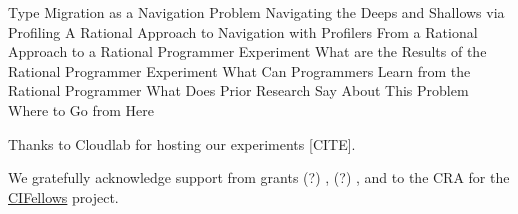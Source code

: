 \documentclass[acmsmall,review,anonymous]{acmart}
\begin{document}
       {Type Migration as a Navigation Problem}
    {Navigating the Deeps and Shallows via Profiling}
       {A Rational Approach to Navigation with Profilers}
  {From a Rational Approach to a Rational Programmer Experiment}
     {What are the Results of the Rational Programmer Experiment}
  {What Can Programmers Learn from the Rational Programmer}
     {What Does Prior Research Say About This Problem}
  {Where to Go from Here}


\begin{acks}
  Thanks to Cloudlab for hosting our experiments [CITE].

We gratefully acknowledge support from
 grants
  (?) \href{"https://www.nsf.gov/awardsearch/showAward?AWD_ID=1763922"}{},
  (?) \href{"https://www.nsf.gov/awardsearch/showAward?AWD_ID=1823244"}{},
 and
 \href{"https://www.nsf.gov/awardsearch/showAward?AWD_ID=2030859"}{}
  to the CRA for the \href{https://cifellows2020.org}{CIFellows} project.
\end{acks}



\end{document}
